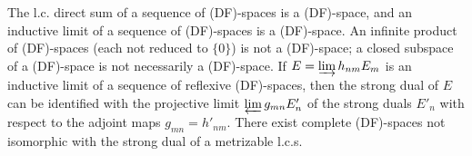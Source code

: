 The l.c. direct sum of a sequence of (DF)-spaces is a (DF)-space, and an inductive limit of a sequence of (DF)-spaces is a (DF)-space. An infinite product of (DF)-spaces (each not reduced to $\{0\}$) is not a (DF)-space; a closed subspace of a (DF)-space is not necessarily a (DF)-space. If $E = \varinjlim h_{nm} E_m$ is an inductive limit of a sequence of reflexive (DF)-spaces, then the strong dual of $E$ can be identified with the projective limit $\varprojlim g_{mn} E'_n$ of the strong duals $E'_n$ with respect to the adjoint maps $g_{mn} = h'_{nm}$. There exist complete (DF)-spaces not isomorphic with the strong dual of a metrizable l.c.s.
